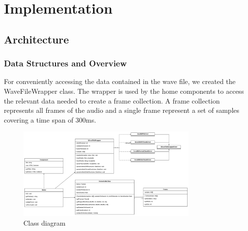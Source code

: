 \section{Implementation}

\subsection{Architecture}

\subsubsection{Data Structures and Overview}
For conveniently accessing the data contained in the wave file, we created the WaveFileWrapper class. The wrapper is used by the home components to access the relevant data needed to create a frame collection. A frame collection represents all frames of the audio and a single frame represent a set of samples covering a time span of 300ms.

\begin{figure}[H]
    \centering
    \includegraphics[width=0.8\textwidth]{../assets/class_diagram.png}
    \caption{Class diagram}
\end{figure}

